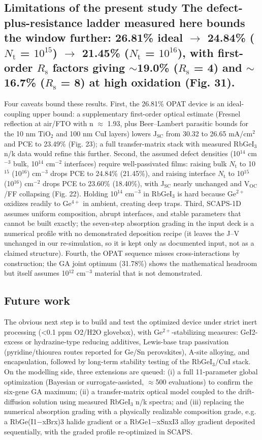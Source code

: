\documentclass[review]{elsarticle}
\begin{document}
\subsection{Limitations of the present study The defect-plus-resistance ladder measured here bounds the window further: 26.81\% ideal $\rightarrow$ 24.84\% ($N_{\mathrm{t}}$ = $10^{15}$) $\rightarrow$ 21.45\% ($N_{\mathrm{t}}$ = $10^{16}$), with first-order $R_{\mathrm{s}}$ factors giving $\sim$19.0\% ($R_{\mathrm{s}}$ = 4) and $\sim$16.7\% ($R_{\mathrm{s}}$ = 8) at high oxidation (Fig. 31).}
Four caveats bound these results. First, the 26.81\% OPAT device is an ideal-coupling upper bound: a supplementary first-order optical estimate (Fresnel reflection at air/FTO with n $\approx$ 1.93, plus Beer--Lambert parasitic bounds for the 10 nm TiO$_{2}$ and 100 nm CuI layers) lowers J$_{\mathrm{SC}}$ from 30.32 to 26.65 mA/cm$^{2}$ and PCE to 23.49\% (Fig. 23); a full transfer-matrix stack with measured RbGeI$_{3}$ n/k data would refine this further. Second, the assumed defect densities (10$^{14}$ cm$^{-3}$ bulk, 10$^{14}$ cm$^{-2}$ interfaces) require well-passivated films: raising bulk $N_{\mathrm{t}}$ to 10$^{15}$ (10$^{16}$) cm$^{-3}$ drops PCE to 24.84\% (21.45\%), and raising interface $N_{\mathrm{t}}$ to 10$^{15}$ (10$^{16}$) cm$^{-2}$ drops PCE to 23.60\% (18.40\%), with J$_{\mathrm{SC}}$ nearly unchanged and V$_{\mathrm{OC}}$/FF collapsing (Fig. 22). Holding 10$^{14}$ cm$^{-3}$ in RbGeI$_{3}$ is hard because Ge$^{2+}$ oxidizes readily to Ge$^{4+}$ in ambient, creating deep traps. Third, SCAPS-1D assumes uniform composition, abrupt interfaces, and stable parameters that cannot be built exactly; the seven-step absorption grading in the input deck is a numerical profile with no demonstrated deposition recipe (it leaves the J--V unchanged in our re-simulation, so it is kept only as documented input, not as a claimed structure). Fourth, the OPAT sequence misses cross-interactions by construction; the GA joint optimum (31.78\%) shows the mathematical headroom but itself assumes 10$^{12}$ cm$^{-3}$ material that is not demonstrated.

\subsection{Future work}
The obvious next step is to build and test the optimized device under strict inert processing (<0.1 ppm O2/H2O glovebox), with Ge$^{2+}$-stabilizing measures: GeI2-excess or hydrazine-type reducing additives, Lewis-base trap passivation (pyridine/thiourea routes reported for Ge/Sn perovskites), A-site alloying, and encapsulation, followed by long-term stability testing of the RbGeI$_{3}$/CuI stack. On the modelling side, three extensions are queued: (i) a full 11-parameter global optimization (Bayesian or surrogate-assisted, $\approx$500 evaluations) to confirm the six-gene GA maximum; (ii) a transfer-matrix optical model coupled to the drift-diffusion solution using measured RbGeI$_{3}$ n/k spectra; and (iii) replacing the numerical absorption grading with a physically realizable composition grade, e.g. a RbGe(I1$-$xBrx)3 halide gradient or a RbGe1$-$xSnxI3 alloy gradient deposited sequentially, with the graded profile re-optimized in SCAPS.
\end{document}
